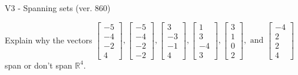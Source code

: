 \begin{exercise}
  \begin{exerciseTitle}V3 - Spanning sets (ver. 860)\end{exerciseTitle}
  \begin{exerciseStatement}
    Explain why the vectors \(\left[\begin{array}{r}
-5 \\
-4 \\
-2 \\
4
\end{array}\right] , \left[\begin{array}{r}
-5 \\
-4 \\
-2 \\
-2
\end{array}\right] , \left[\begin{array}{r}
3 \\
-3 \\
-1 \\
4
\end{array}\right] , \left[\begin{array}{r}
1 \\
3 \\
-4 \\
3
\end{array}\right] , \left[\begin{array}{r}
3 \\
1 \\
0 \\
2
\end{array}\right] , \text{ and } \left[\begin{array}{r}
-4 \\
2 \\
2 \\
4
\end{array}\right]\) span or don't span \(\mathbb{R}^4\). 
	



\end{exerciseStatement}
\end{exercise}
